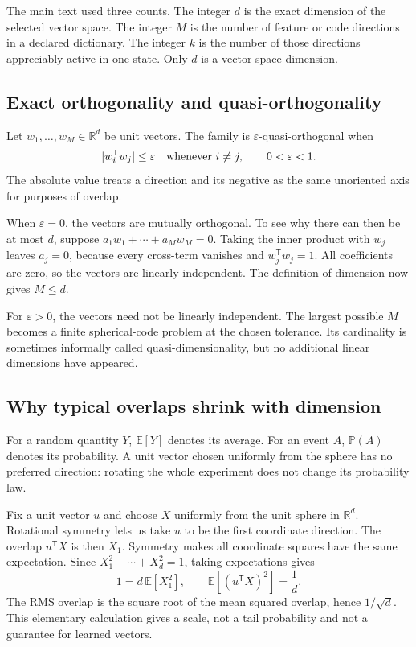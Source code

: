 \documentclass[
  aps,
  reprint,
  superscriptaddress,
  floatfix,
  nofootinbib,
  longbibliography
]{revtex4-2}
\newcommand{\R}{\mathbb{R}}
\newcommand{\E}{\mathbb{E}}
\newcommand{\Prob}{\mathbb{P}}
\newcommand{\T}{^{\mathsf T}}
\begin{document}
The main text used three counts.  The integer $d$ is the exact dimension of
the selected vector space.  The integer $M$ is the number of feature or code
directions in a declared dictionary.  The integer $k$ is the number of those
directions appreciably active in one state.  Only $d$ is a vector-space
dimension.

\subsection{Exact orthogonality and quasi-orthogonality}

Let $w_1,\ldots,w_M\in\R^d$ be unit vectors.  The family is
$\varepsilon$-quasi-orthogonal when
\begin{equation}
 |w_i\T w_j|\leq\varepsilon
 \quad\hbox{whenever }i\ne j,
 \qquad 0<\varepsilon<1.
 \label{eq:quasi-app}
\end{equation}
The absolute value treats a direction and its negative as the same
unoriented axis for purposes of overlap.

When $\varepsilon=0$, the vectors are mutually orthogonal.  To see why there
can then be at most $d$, suppose
$a_1w_1+\cdots+a_Mw_M=0$.  Taking the inner product with $w_j$ leaves
$a_j=0$, because every cross-term vanishes and $w_j\T w_j=1$.  All
coefficients are zero, so the vectors are linearly independent.  The
definition of dimension now gives $M\leq d$.

For $\varepsilon>0$, the vectors need not be linearly independent.  The
largest possible $M$ becomes a finite spherical-code problem at the chosen
tolerance.  Its cardinality is sometimes informally called
quasi-dimensionality, but no additional linear dimensions have appeared.

\subsection{Why typical overlaps shrink with dimension}

For a random quantity $Y$, $\E[Y]$ denotes its average.  For an event $A$,
$\Prob(A)$ denotes its probability.  A unit vector chosen uniformly from the
sphere has no preferred direction: rotating the whole experiment does not
change its probability law.

Fix a unit vector $u$ and choose $X$ uniformly from the unit sphere in
$\R^d$.  Rotational symmetry lets us take $u$ to be the first coordinate
direction.  The overlap $u\T X$ is then $X_1$.  Symmetry makes all coordinate
squares have the same expectation.  Since
$X_1^2+\cdots+X_d^2=1$, taking expectations gives
\begin{equation}
 1=d\,\E[X_1^2],
 \qquad
 \E[(u\T X)^2]=\frac1d.
 \label{eq:rms-overlap-app}
\end{equation}
The RMS overlap is the square root of the mean squared overlap, hence
$1/\sqrt d$.  This elementary calculation gives a scale, not a tail
probability and not a guarantee for learned vectors.
\end{document}
